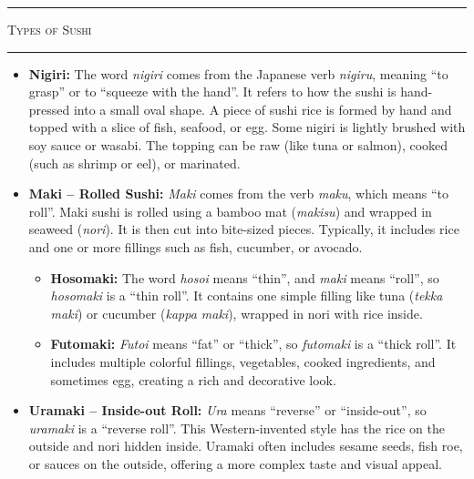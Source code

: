 \documentclass[landscape, a4paper]{article}
\newcommand\alert[1]{\textcolor{PrimaryColor}{\textbf{#1}}}
\begin{document}
\hfill%
\vrule width 0.01cm
\hfill%
\begin{minipage}[t]{0.31\textwidth}
	\vspace{0.5cm}
	\setlength{\parskip}{0.25cm}

	\textcolor{PrimaryColor}{
		\rule{\linewidth}{0.5mm}
		\vspace{-0.1cm}
		\begin{center}
			\large
			\textsc{Types of Sushi}
		\end{center}
		\rule{\linewidth}{0.5mm}
	}

	\begin{itemize}
		\item \alert{Nigiri:}
		The word \textit{nigiri} comes from the Japanese verb \textit{nigiru}, meaning \enquote{to grasp} or to \enquote{squeeze with the hand}. It refers to how the sushi is hand-pressed into a small oval shape.
		A piece of sushi rice is formed by hand and topped with a slice of fish, seafood, or egg. Some nigiri is lightly brushed with soy sauce or wasabi. The topping can be raw (like tuna or salmon), cooked (such as shrimp or eel), or marinated.

		\item \alert{Maki – Rolled Sushi:}
		\textit{Maki} comes from the verb \textit{maku}, which means \enquote{to roll}. Maki sushi is rolled using a bamboo mat (\textit{makisu}) and wrapped in seaweed (\textit{nori}). It is then cut into bite-sized pieces. Typically, it includes rice and one or more fillings such as fish, cucumber, or avocado.
		\begin{itemize}
			\item \alert{Hosomaki:}
			The word \textit{hosoi} means \enquote{thin}, and \textit{maki} means \enquote{roll}, so \textit{hosomaki} is a \enquote{thin roll}. It contains one simple filling like tuna (\textit{tekka maki}) or cucumber (\textit{kappa maki}), wrapped in nori with rice inside.

			\item \alert{Futomaki:}
			\textit{Futoi} means \enquote{fat} or \enquote{thick}, so \textit{futomaki} is a \enquote{thick roll}. It includes multiple colorful fillings, vegetables, cooked ingredients, and sometimes egg, creating a rich and decorative look.
		\end{itemize}

		\item \alert{Uramaki – Inside-out Roll:}
		\textit{Ura} means \enquote{reverse} or \enquote{inside-out}, so \textit{uramaki} is a \enquote{reverse roll}. This Western-invented style has the rice on the outside and nori hidden inside. Uramaki often includes sesame seeds, fish roe, or sauces on the outside, offering a more complex taste and visual appeal.
	\end{itemize}


\end{minipage}
\end{document}
